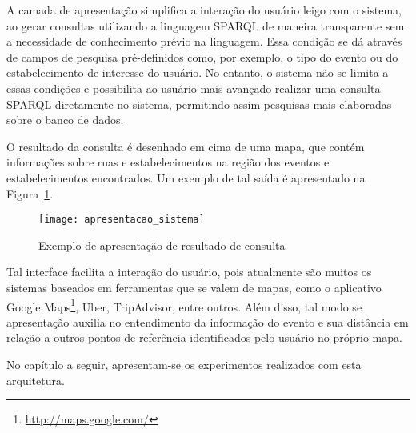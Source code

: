 A camada de apresentação simplifica a interação do usuário leigo com o sistema, ao gerar consultas utilizando a linguagem SPARQL de maneira transparente sem a necessidade de conhecimento prévio na linguagem. Essa condição se dá através de campos de pesquisa pré-definidos como, por exemplo, o tipo do evento ou do estabelecimento de interesse do usuário. No entanto, o sistema não se limita a essas condições e possibilita ao usuário mais avançado realizar uma consulta SPARQL diretamente no sistema, permitindo assim pesquisas mais elaboradas sobre o banco de dados. 

O resultado da consulta é desenhado em cima de uma mapa, que contém informações sobre ruas e estabelecimentos na região dos eventos e estabelecimentos encontrados. Um exemplo de tal saída é apresentado na Figura~\ref{fig:arquitetura_apresentacao}.

\begin{figure}[!ht]
  \centering
  \texttt{[image: apresentacao\_sistema]} 
  \caption{Exemplo de apresentação de resultado de consulta}
  \label{fig:arquitetura_apresentacao} 
\end{figure}

Tal interface facilita a interação do usuário, pois atualmente são muitos os sistemas baseados em ferramentas que se valem de mapas, como o aplicativo Google Maps\footnote{\url{http://maps.google.com/}}, Uber, TripAdvisor, entre outros. Além disso, tal modo se apresentação auxilia no entendimento da informação do evento e sua distância em relação a outros pontos de referência identificados pelo usuário no próprio mapa. 


No capítulo a seguir, apresentam-se os experimentos realizados com esta arquitetura.